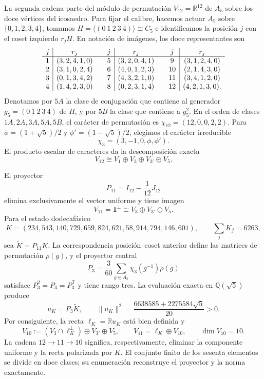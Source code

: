 La segunda cadena parte del módulo de permutación
\(V_{12}=\mathbb R^{12}\) de \(A_5\) sobre los doce vértices del icosaedro.
Para fijar el calibre, hacemos actuar \(A_5\) sobre
\(\{0,1,2,3,4\}\), tomamos
\(H=\langle(0\ 1\ 2\ 3\ 4)\rangle\cong C_5\) e identificamos la posición
\(j\) con el coset izquierdo \(r_jH\). En notación de imágenes, los doce
representantes son
\[
\begin{array}{c|c@{\qquad}c|c@{\qquad}c|c}
j&r_j&j&r_j&j&r_j\\ \hline
1&(3,2,4,1,0)&5&(3,2,0,4,1)&9&(3,1,2,4,0)\\
2&(3,1,0,2,4)&6&(4,0,1,2,3)&10&(2,1,4,3,0)\\
3&(0,1,3,4,2)&7&(4,3,2,1,0)&11&(3,4,1,2,0)\\
4&(1,4,2,3,0)&8&(0,2,3,1,4)&12&(4,2,1,3,0).
\end{array}
\]
Denotamos por \(5A\) la clase de conjugación que contiene al generador
\(g_5=(0\ 1\ 2\ 3\ 4)\) de \(H\), y por \(5B\) la clase que contiene a
\(g_5^2\). En el orden de clases \(1A,2A,3A,5A,5B\), el carácter de permutación es
\(\chi_{12}=(12,0,0,2,2)\). Para
\(\phi=(1+\sqrt5)/2\) y \(\phi'=(1-\sqrt5)/2\), elegimos el carácter
irreducible
\[
 \chi_3=(3,-1,0,\phi,\phi').
\]
El producto escalar de caracteres da la descomposición exacta
\[
 V_{12}\cong V_1\oplus V_3\oplus V_{3'}\oplus V_5.
\]

El proyector
\[
 P_{11}=I_{12}-\frac1{12}J_{12}
\]
elimina exclusivamente el vector uniforme y tiene imagen
\[
 V_{11}=\mathbf1^\perp\cong V_3\oplus V_{3'}\oplus V_5.
\]
Para el estado dodecafásico
\[
 K=(234,543,140,729,659,824,621,58,914,794,146,601),
 \qquad \sum_jK_j=6263,
\]
sea \(\widetilde K=P_{11}K\). La correspondencia posición--coset anterior
define las matrices de permutación \(\rho(g)\), y el proyector central
\[
 P_3=\frac3{60}\sum_{g\in A_5}\chi_3(g^{-1})\rho(g)
\]
satisface \(P_3^2=P_3=P_3^{\mathsf T}\) y tiene rango tres. La evaluación
exacta en \(\mathbb Q(\sqrt5)\) produce
\[
 u_K=P_3\widetilde K,
 \qquad
 \|u_K\|^2=\frac{6638585+2275584\sqrt5}{20}>0.
\]
Por consiguiente, la recta \(\ell_K=\mathbb Ru_K\) está bien definida y
\[
 V_{10}:=(V_3\cap\ell_K^\perp)\oplus V_{3'}\oplus V_5,
 \qquad
 V_{11}=\ell_K\oplus V_{10},
 \qquad \dim V_{10}=10.
\]
La cadena \(12\to11\to10\) significa, respectivamente, eliminar la
componente uniforme y la recta polarizada por \(K\). El conjunto finito de
los sesenta elementos se divide en doce clases; su enumeración
reconstruye el proyector y la norma exactamente.

